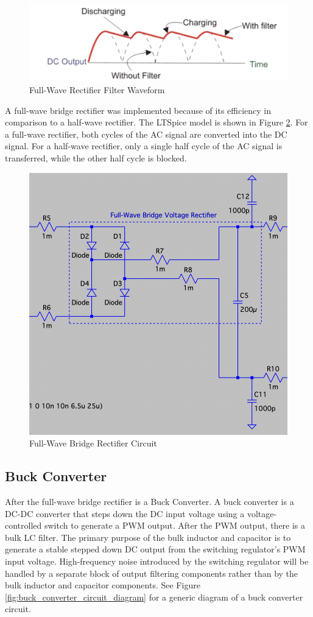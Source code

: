 \documentclass[conference]{IEEEtran}
\begin{document}
\begin{figure}[h]
    \centering
    \includegraphics[width=1.0\linewidth]{full-wave_bridge_rectifier_filter_waveform.png}
    \caption{Full-Wave Rectifier Filter Waveform}
    \label{fig:full-wave_bridge_rectifier_filter_waveform_diagram}
\end{figure}


A full-wave bridge rectifier was implemented because of its efficiency in comparison to a half-wave rectifier. The LTSpice model is shown in Figure \ref{fig:full-wave_bridge_rectifier_circuit_diagram}. For a full-wave rectifier, both cycles of the AC signal are converted into the DC signal. For a half-wave rectifier, only a single half cycle of the AC signal is transferred, while the other half cycle is blocked. 

\begin{figure}[h]
    \centering
    \includegraphics[width=0.5\linewidth]{full-wave_bridge_rectifier_circuit.png}
    \caption{Full-Wave Bridge Rectifier Circuit}
    \label{fig:full-wave_bridge_rectifier_circuit_diagram}
\end{figure}

\FloatBarrier

\subsection{Buck Converter}
After the full-wave bridge rectifier is a Buck Converter. A buck converter is a DC-DC converter that steps down the DC input voltage using a voltage-controlled switch to generate a PWM output. After the PWM output, there is a bulk LC filter. The primary purpose of the bulk inductor and capacitor is to generate a stable stepped down DC output from the switching regulator's PWM input voltage. High-frequency noise introduced by the switching regulator will be handled by a separate block of output filtering components rather than by the bulk inductor and capacitor components. See Figure \ref{fig:buck_converter_circuit_diagram} for a generic diagram of a buck converter circuit.
\end{document}
